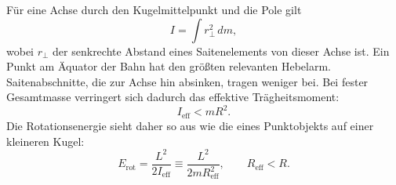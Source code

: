 Für eine Achse durch den Kugelmittelpunkt und die Pole gilt
\begin{equation}
  I=\int r_\perp^2\,dm,
  \label{eq:l09-extended-inertia}
\end{equation}
wobei \(r_\perp\) der senkrechte Abstand eines Saitenelements von dieser Achse ist. Ein Punkt am Äquator der Bahn hat den größten relevanten Hebelarm. Saitenabschnitte, die zur Achse hin absinken, tragen weniger bei. Bei fester Gesamtmasse verringert sich dadurch das effektive Trägheitsmoment:
\begin{equation}
  I_{\mathrm{eff}}<mR^2.
  \label{eq:l09-inertia-reduction}
\end{equation}
Die Rotationsenergie sieht daher so aus wie die eines Punktobjekts auf einer kleineren Kugel:
\begin{equation}
  E_{\mathrm{rot}}
  =\frac{L^2}{2I_{\mathrm{eff}}}
  \equiv \frac{L^2}{2mR_{\mathrm{eff}}^2},
  \qquad R_{\mathrm{eff}}<R.
  \label{eq:l09-effective-radius}
\end{equation}

\begin{classroomqa}
\end{classroomqa}

